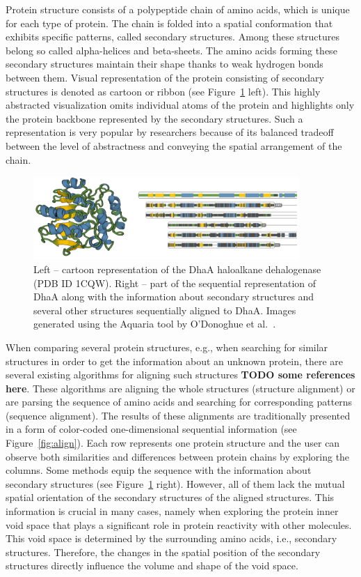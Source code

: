 \documentclass[twocolumn]{bmcart}%
\begin{document}
Protein structure consists of a polypeptide chain of amino acids, which is unique for each type of protein. 
The chain is folded into a spatial conformation that exhibits specific patterns, called secondary structures.
Among these structures belong so called alpha-helices and beta-sheets. 
The amino acids forming these secondary structures maintain their shape thanks to weak hydrogen bonds between them.
Visual representation of the protein consisting of secondary structures is denoted as cartoon or ribbon (see Figure~\ref{fig:aquaria} left).
This highly abstracted visualization omits individual atoms of the protein and highlights only the protein backbone represented by the secondary structures.
Such a representation is very popular by researchers because of its balanced tradeoff between the level of abstractness and conveying the spatial arrangement of the chain.

\begin{figure}[th]
  \centering
  \includegraphics[width=0.9\textwidth]{pics/aquaria.png}
  \caption{Left -- cartoon representation of the DhaA haloalkane dehalogenase (PDB ID 1CQW). Right -- part of the sequential representation of DhaA along with the information about secondary structures and several other structures sequentially aligned to DhaA. Images generated using the Aquaria tool by O'Donoghue et al.~\cite{odonoghue2015}.}
  \label{fig:aquaria}
\end{figure}

When comparing several protein structures, e.g., when searching for similar structures in order to get the information about an unknown protein, there are several existing algorithms for aligning such structures \textbf{TODO some references here}.
These algorithms are aligning the whole structures (structure alignment) or are parsing the sequence of amino acids and searching for corresponding patterns (sequence alignment). 
The results of these alignments are traditionally presented in a form of color-coded one-dimensional sequential information (see Figure~\ref{fig:align}).
Each row represents one protein structure and the user can observe both similarities and differences between protein chains by exploring the columns.
Some methods equip the sequence with the information about secondary structures (see Figure~\ref{fig:aquaria} right).
However, all of them lack the mutual spatial orientation of the secondary structures of the aligned structures.
This information is crucial in many cases, namely when exploring the protein inner void space that plays a significant role in protein reactivity with other molecules.
This void space is determined by the surrounding amino acids, i.e., secondary structures. 
Therefore, the changes in the spatial position of the secondary structures directly influence the volume and shape of the void space.
\end{document}
